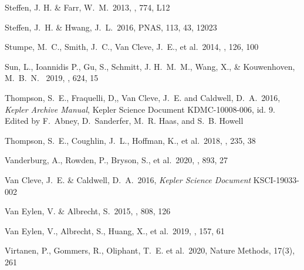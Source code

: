\documentclass{aastex62}
\def\pnas{PNAS}
\begin{document}
\begin{thebibliography}{}

{Steffen}, J. H. \& {Farr}, W.~M.~2013,  \apjl, 774, L12


{Steffen}, J.~H. \& {Hwang}, J.~L.~2016,  \pnas, 113, 43, 12023

{Stumpe}, M.~C., Smith, J.~C., Van Cleve, J.~E., et al.~2014, \pasp, 126, 100

Sun, L., Ioannidis P., Gu, S., Schmitt, J. H.~M.~M.,  Wang, X., \& 
Kouwenhoven, M.~B.~N.~ 2019, \aap, 624, 15


Thompson, S.~E., Fraquelli, D,, Van Cleve, J.~E. and Caldwell, D.~A.~2016,
{\it Kepler Archive Manual}, Kepler Science Document KDMC-10008-006, id. 9. Edited by F.~Abney, D.~Sanderfer, M.~R. Haas, and S.~B. Howell 

Thompson, S.~E., Coughlin, J.~L.,  Hoffman, K., et al.~2018,
\apjs, 235, 38 



  Vanderburg, A., Rowden, P., Bryson, S., et al.~2020,  \apj, 893, 27

 Van Cleve, J.~E. \& Caldwell, D.~A.~2016, {\it Kepler Science Document} KSCI-19033-002

 Van Eylen, V. \& Albrecht, S.\ 2015, \apj, 808, 126 %

 Van Eylen, V., Albrecht, S., Huang, X., et al.\ 2019, \aj, 157, 61 %

 Virtanen, P., Gommers, R., Oliphant, T.~E. et al.~2020, Nature Methods, 17(3), 261%



\end{thebibliography}
\end{document}
